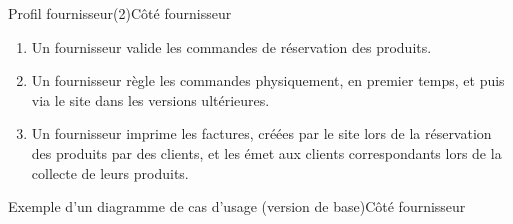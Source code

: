 \documentclass[usenames,dvipsnames]{beamer}
\begin{document}
\begin{frame}{Profil fournisseur(2)}{Côté fournisseur}
\begin{enumerate}
  \item Un fournisseur valide les commandes de réservation des produits.
  \item Un fournisseur règle les commandes physiquement, en premier temps, et puis via le site dans les versions ultérieures.
  \item Un fournisseur imprime les factures, créées par le site lors de la réservation des produits par des clients, et les émet aux clients correspondants lors de la collecte de leurs produits.
\end{enumerate}
\end{frame}

\begin{frame}{Exemple d'un diagramme de cas d'usage (version de base)}{Côté fournisseur}
\begin{figure}[!ht]
  \centering
\end{figure}
\end{frame}
\end{document}
